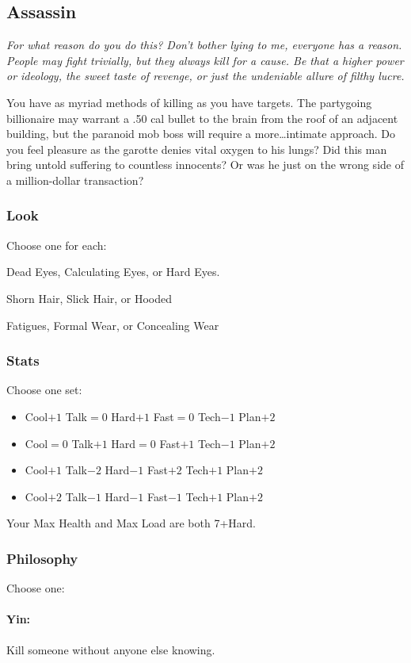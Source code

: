 \subsection{Assassin}
{\itshape For what reason do you do this? Don't bother lying to me,
  everyone has a reason. People may fight trivially, but they always
  kill for a cause. Be that a higher power or ideology, the sweet
  taste of revenge, or just the undeniable allure of filthy lucre.

You have as myriad methods of killing as you have targets. The
partygoing billionaire may warrant a .50 cal bullet to the brain from
the roof of an adjacent building, but the paranoid mob boss will
require a more\ldots intimate approach. Do you feel pleasure as the
garotte denies vital oxygen to his lungs? Did this man bring untold
suffering to countless innocents? Or was he just on the wrong side of
a million-dollar transaction?}

\subsubsection{Look}
Choose one for each:

Dead Eyes, Calculating Eyes, or Hard Eyes.

Shorn Hair, Slick Hair, or Hooded

Fatigues, Formal Wear, or Concealing Wear

\subsubsection{Stats}
Choose one set:
\begin{itemize}
\setlength\itemsep{0em}
\item Cool$+1$ Talk${=}0$ Hard$+1$ Fast${=}0$ Tech$-1$ Plan$+2$
\item Cool${=}0$ Talk$+1$ Hard${=}0$ Fast$+1$ Tech$-1$ Plan$+2$
\item Cool$+1$ Talk$-2$ Hard$-1$ Fast$+2$ Tech$+1$ Plan$+2$
\item Cool$+2$ Talk$-1$ Hard$-1$ Fast$-1$ Tech$+1$ Plan$+2$
\end{itemize}

Your Max Health and Max Load are both 7+Hard.

\subsubsection{Philosophy}
Choose one:
\paragraph{Yin:} Kill someone without anyone else knowing.
